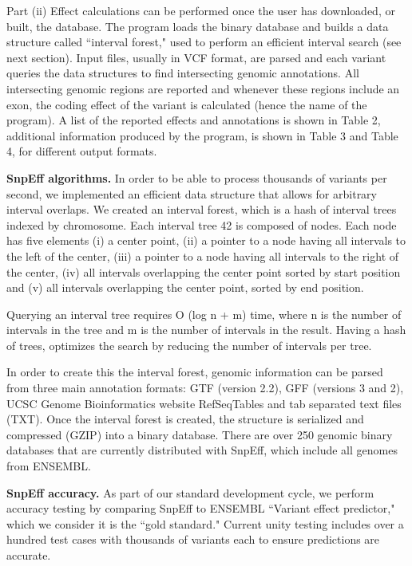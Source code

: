 Part (ii) Effect calculations can be performed once the user has downloaded, or built, the database. The program loads the binary database and builds a data structure called ``interval forest," used to perform an efficient interval search (see next section). Input files, usually in VCF format, are parsed and each variant queries the data structures to find intersecting genomic annotations. All intersecting genomic regions are reported and whenever these regions include an exon, the coding effect of the variant is calculated (hence the name of the program). A list of the reported effects and annotations is shown in Table 2, additional information produced by the program, is shown in Table 3 and Table 4, for different output formats.

\textbf{SnpEff algorithms.} In order to be able to process thousands of variants per second, we implemented an efficient data structure that allows for arbitrary interval overlaps. We created an interval forest, which is a hash of interval trees indexed by chromosome.  Each interval tree 42 is composed of nodes. Each node has five elements (i) a center point, (ii) a pointer to a node having all intervals to the left of the center, (iii) a pointer to a node having all intervals to the right of the center, (iv) all intervals overlapping the center point sorted by start position and (v) all intervals overlapping the center point, sorted by end position.

Querying an interval tree requires O (log n + m) time, where n is the number of intervals in the tree and m is the number of intervals in the result. Having a hash of trees, optimizes the search by reducing the number of intervals per tree.

In order to create this the interval forest, genomic information can be parsed from three main annotation formats: GTF (version 2.2), GFF (versions 3 and 2), UCSC Genome Bioinformatics website RefSeqTables and tab separated text files (TXT). Once the interval forest is created, the structure is serialized and compressed (GZIP) into a binary database. There are over 250 genomic binary databases that are currently distributed with SnpEff, which include all genomes from ENSEMBL.

\textbf{SnpEff accuracy.} As part of our standard development cycle, we perform accuracy testing by comparing SnpEff to ENSEMBL ``Variant effect predictor," which we consider it is the ``gold standard." Current unity testing includes over a hundred test cases with thousands of variants each to ensure predictions are accurate.

